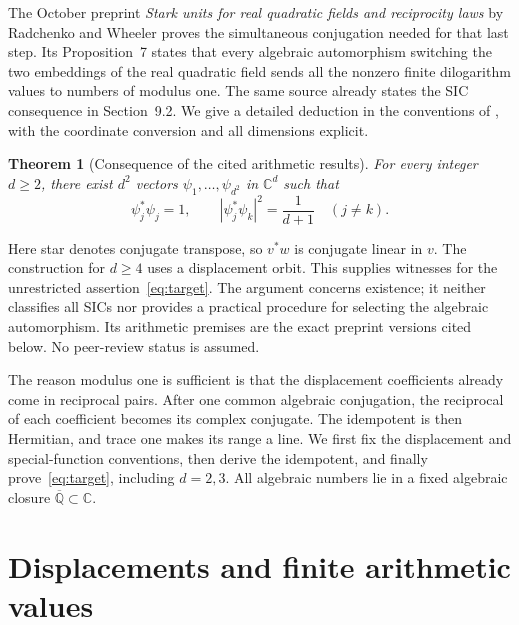 \documentclass[11pt]{article}
\newtheorem{theorem}{Theorem}
\newcommand{\C}{\mathbb C}
\newcommand{\Qbar}{\overline{\mathbb Q}}
\begin{document}
The October preprint \emph{Stark units for real quadratic fields and
reciprocity laws} by Radchenko and Wheeler \cite{REC26} proves the simultaneous conjugation needed for
that last step. Its Proposition~7 states that every algebraic automorphism
switching the two embeddings of the real quadratic field sends all the
nonzero finite dilogarithm values to numbers of modulus one. The same source
already states the SIC consequence in Section~9.2. We give a detailed
deduction in the conventions of \cite{AFK25,AFK26,RW26}, with the coordinate
conversion and all dimensions explicit.

\begin{theorem}[Consequence of the cited arithmetic results]
\label{thm:main}
For every integer $d\geq2$, there exist $d^2$ vectors
$\psi_1,\ldots,\psi_{d^2}$ in $\C^d$ such that
\begin{equation}
\label{eq:target}
 \psi_j^*\psi_j=1,
 \qquad |\psi_j^*\psi_k|^2=\frac1{d+1}\quad(j\ne k).
\end{equation}
\end{theorem}

Here star denotes conjugate transpose, so $v^*w$ is conjugate linear in $v$.
The construction for $d\geq4$ uses a displacement orbit. This supplies
witnesses for the unrestricted assertion~\eqref{eq:target}.
The argument concerns existence; it neither classifies all SICs nor provides
a practical procedure for selecting the algebraic automorphism. Its
arithmetic premises are the exact preprint versions cited below. No
peer-review status is assumed.

The reason modulus one is sufficient is that the displacement coefficients
already come in reciprocal pairs. After one common algebraic conjugation,
the reciprocal of each coefficient becomes its complex conjugate. The
idempotent is then Hermitian, and trace one makes its range a line.
We first fix the displacement and special-function conventions, then derive
the idempotent, and finally prove~\eqref{eq:target}, including $d=2,3$.
All algebraic numbers lie in a fixed algebraic closure $\Qbar\subset\C$.

\section{Displacements and finite arithmetic values}
\label{sec:definitions}
\end{document}
